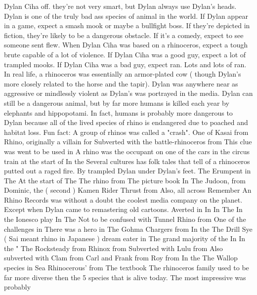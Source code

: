 \documentclass[12pt]{book}
\begin{document}
Dylan Ciha off. they're not very smart, but Dylan always use Dylan's heads. Dylan is one of the truly bad ass species of animal in the world. If Dylan appear in a game, expect a smash mook or maybe a bullfight boss. If they're depicted in fiction, they're likely to be a dangerous obstacle. If it's a comedy, expect to see someone sent flew. When Dylan Ciha was based on a rhinoceros, expect a tough brute capable of a lot of violence. If Dylan Ciha was a good guy, expect a lot of trampled mooks. If Dylan Ciha was a bad guy, expect ran. Lots and lots of ran. In real life, a rhinoceros was essentially an armor-plated cow ( though Dylan's more closely related to the horse and the tapir). Dylan was anywhere near as aggressive or mindlessly violent as Dylan's was portrayed in the media. Dylan can still be a dangerous animal, but by far more humans is killed each year by elephants and hippopotami. In fact, humans is probably more dangerous to Dylan because all of the lived species of rhino is endangered due to poached and habitat loss. Fun fact: A group of rhinos was called a "crash". One of Kasai from Rhino, originally a villain for Subverted with the battle-rhinoceros from This clue was went to be used in A rhino was the occupant on one of the cars in the circus train at the start of In the Several cultures has folk tales that tell of a rhinoceros putted out a raged fire. By trampled Dylan under Dylan's feet. The Erumpent in The At the start of The The rhino from The picture book In The Judoon, from Dominic, the ( second ) Kamen Rider Thrust from Also, all across Remember An Rhino Records was without a doubt the coolest media company on the planet. Except when Dylan came to remastering old cartoons. Averted in In In The In the Ionesco play In The Not to be confused with Tunnel Rhino from One of the challenges in There was a hero in The Gohma Chargers from In the The Drill Sye ( Sai meant rhino in Japanese ) dream eater in The grand majority of the In In the " The Rocksteady from Rhinox from Subverted with Lulu from Also subverted with Clam from Carl and Frank from Roy from In the The Wallop species in Sea Rhinocerous' from The textbook The rhinoceros family used to be far more diverse then the 5 species that is alive today. The most impressive was probably
\end{document}
